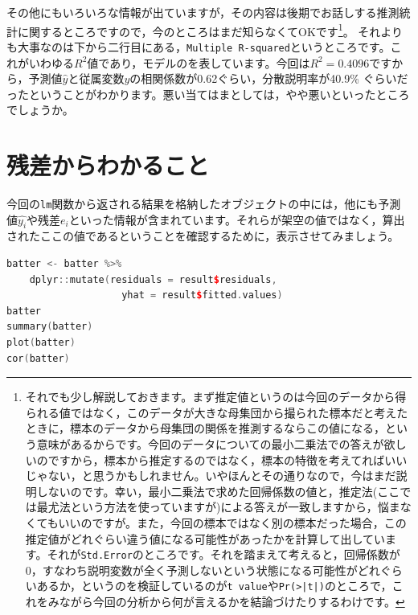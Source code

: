 \documentclass{ltjbook}
\begin{document}
その他にもいろいろな情報が出ていますが，その内容は後期でお話しする推測統計に関するところですので，今のところはまだ知らなくてOKです\footnote{それでも少し解説しておきます。まず推定値というのは今回のデータから得られる値ではなく，このデータが大きな母集団から撮られた標本だと考えたときに，標本のデータから母集団の関係を推測するならこの値になる，という意味があるからです。今回のデータについての最小二乗法での答えが欲しいのですから，標本から推定するのではなく，標本の特徴を考えてればいいじゃない，と思うかもしれません。いやほんとその通りなので，今はまだ説明しないのです。幸い，最小二乗法で求めた回帰係数の値と，推定法(ここでは最尤法という方法を使っていますが)による答えが一致しますから，悩まなくてもいいのですが。また，今回の標本ではなく別の標本だった場合，この推定値がどれぐらい違う値になる可能性があったかを計算して出しています。それが\texttt{Std.Error}のところです。それを踏まえて考えると，回帰係数が0，すなわち説明変数が全く予測しないという状態になる可能性がどれぐらいあるか，というのを検証しているのが\texttt{t value}や\texttt{Pr(>|t|)}のところで，これをみながら今回の分析から何が言えるかを結論づけたりするわけです。}。
それよりも大事なのは下から二行目にある，\texttt{Multiple R-squared}というところです。これがいわゆる$R^2$値であり，モデルのを表しています。今回は$R^2=0.4096$ですから，予測値$\hat{y}$と従属変数$y$の相関係数が0.62ぐらい，分散説明率が40.9\% ぐらいだったということがわかります。悪い当てはまとしては，やや悪いといったところでしょうか。

\section{残差からわかること}
今回の\texttt{lm}関数から返される結果を格納したオブジェクトの中には，他にも予測値$\hat{y_i}$や残差$e_i$といった情報が含まれています。それらが架空の値ではなく，算出されたここの値であるということを確認するために，表示させてみましょう。

\begin{lstlisting}[language=c++,label={code::11_05},caption={回帰分析のその他の情報}]
batter <- batter %>% 
    dplyr::mutate(residuals = result$residuals,
                    yhat = result$fitted.values) 
batter
summary(batter)
plot(batter)
cor(batter)
\end{lstlisting}
\end{document}
